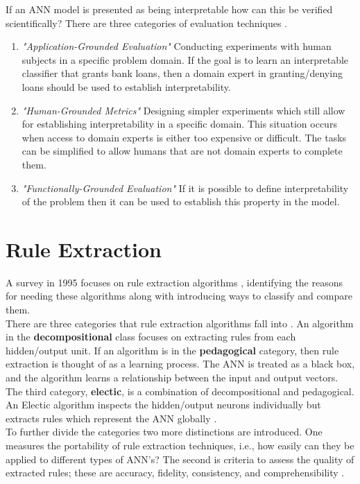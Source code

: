 If an ANN model is presented as being interpretable how can this be verified scientifically? There are three categories of evaluation techniques \cite{doshi2017towards}.
\begin{enumerate}
	\item \textit{"Application-Grounded Evaluation"} Conducting experiments with human subjects in a specific problem domain. If the goal is to learn an interpretable classifier that grants bank loans, then a domain expert in granting/denying loans should be used to establish interpretability.
	
	\item \textit{"Human-Grounded Metrics"} Designing simpler experiments which still allow for establishing interpretability in a specific domain. This situation occurs when access to domain experts is either too expensive or difficult. The tasks can be simplified to allow humans that are not domain experts to complete them.
	
	\item \textit{"Functionally-Grounded Evaluation"} If it is possible to define interpretability of the problem then it can be used to establish this property in the model.
\end{enumerate}


\section{Rule Extraction}

A survey in 1995 focuses on rule extraction algorithms \cite{andrews1995survey}, identifying the reasons for needing these algorithms along with introducing ways to classify and compare them.\\

There are three categories that rule extraction algorithms fall into \cite{andrews1995survey}. An algorithm in the \textbf{decompositional} class focuses on extracting rules from each hidden/output unit. If an algorithm is in the \textbf{pedagogical} category, then rule extraction is thought of as a learning process. The ANN is treated as a black box, and the algorithm learns a relationship between the input and output vectors. The third category, \textbf{electic}, is a combination of decompositional and pedagogical. An Electic algorithm inspects the hidden/output neurons individually but extracts rules which represent the ANN globally \cite{tickle1998truth}.\\

To further divide the categories two more distinctions are introduced. One measures the portability of rule extraction techniques, i.e., how easily can they be applied to different types of ANN's? The second is criteria to assess the quality of extracted rules; these are accuracy, fidelity, consistency, and comprehensibility \cite{andrews1995survey}.

